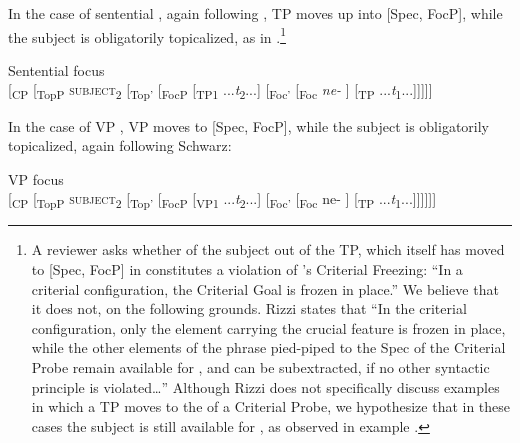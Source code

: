 \documentclass[output=paper,modfonts]{langscibook}
\begin{document}
\newpage 
In the case of sentential , again following \citet{Schwarz2007}, TP moves up into [Spec, FocP], while the subject is obligatorily topicalized, as in .\footnote{A reviewer asks whether  of the subject out of the TP, which itself has moved to [Spec, FocP] in  constitutes a violation of \citealt{Rizzi2010}'s Criterial Freezing: “In a criterial configuration, the Criterial Goal is frozen in place.” We believe that it does not, on the following grounds. Rizzi states that “In the criterial configuration, only the element carrying the crucial feature is frozen in place, while the other elements of the phrase pied-piped to the Spec of the Criterial Probe remain available for , and can be subextracted, if no other syntactic principle is violated…” Although Rizzi does not specifically discuss examples in which a TP moves to the  of a Criterial Probe, we hypothesize that in these cases the subject is still available for , as observed in example .}

\ea\label{ex:landmann:28} 
{Sentential focus}\\{}
     [\textsubscript{CP} [\textsubscript{TopP} \textsc{subject}\textsubscript{2} [\textsubscript{Top}\textsubscript{'} [\textsubscript{FocP} [\textsubscript{TP1} ...\textit{t}\textsubscript{2}...] [\textsubscript{Foc}\textsubscript{'} [\textsubscript{Foc} \textit{ne-} ] [\textsubscript{TP} ...\textit{t}\textsubscript{1}...]]]]]\\
\z

In the case of VP , VP moves to [Spec, FocP], while the subject is obligatorily topicalized, again following Schwarz:

\ea\label{ex:landmann:29}\label{exx:} 
{VP focus}\\{}
 [{\textsubscript{CP}} [{\textsubscript{TopP}} \textsc{subject}{\textsubscript{2}} [{\textsubscript{Top}}{\textsubscript{'}} [{\textsubscript{FocP}} [{\textsubscript{VP1}}{ ...}\textit{t}{\textsubscript{2}}{...] [}{\textsubscript{Foc}}{\textsubscript{'}} [{\textsubscript{Foc}} ne-{ ] [}{\textsubscript{TP}}{ ...}\textit{t}{\textsubscript{1}}{...]]]]]]}\\
\z
 
\end{document}

